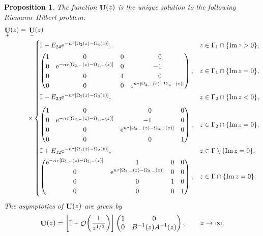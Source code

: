 \documentclass[10pt,a4paper]{amsart}
\DeclareMathOperator{\OO}{\mathcal{O}}
\DeclareMathOperator{\UU}{{\bf U}}
\numberwithin{equation}{section}
\newtheorem{Proposition}[Theorem]{Proposition}
 { \theoremstyle{definition}
\newtheorem{Definition}[Theorem]{Definition}
\newtheorem{Note}[Theorem]{Note}
\newtheorem{Example}[Theorem]{Example}
\newtheorem{Remark}[Theorem]{Remark} }
\begin{document}
 \begin{Proposition}
 The function $\UU(z)$ is the unique solution to the following Riemann--Hilbert problem:
 \begin{align*}%
 \UU_{+}(z)={}& \UU_{-}(z) \nonumber\\
 &{\times} \begin{cases}
 \mathbb{I} - E_{24}{\rm e}^{-n\tau[\Omega_2(z) - \Omega_4(z)]},
 & z \in \Gamma_1 \cap \{\operatorname{Im} z > 0\}, \vspace{1mm}\\
 \begin{pmatrix}
 1 & 0 & 0 & \hphantom{-}0 \\
 0 & {\rm e}^{-n\tau[\Omega_{2,-}(z)-\Omega_{4,-}(z)]} & 0 & -1\\
 0 & 0 & 1 & \hphantom{-}0 \\
 0 & 0 & 0 & {\rm e}^{n\tau[\Omega_{2,-}(z)-\Omega_{4,-}(z)]}
 \end{pmatrix},
 & z \in \Gamma_1 \cap \{\operatorname{Im} z = 0\},\vspace{1mm}\\
 \mathbb{I} - E_{23}{\rm e}^{-n\tau[\Omega_2(z) - \Omega_3(z)]},
 & z \in \Gamma_2 \cap \{\operatorname{Im} z < 0\}, \vspace{2mm}\\
 \begin{pmatrix}
 1 & 0 & \hphantom{-}0 & 0 \\
 0 & {\rm e}^{-n\tau[\Omega_{2,-}(z) - \Omega_{3,-}(z)]} & -1 & 0\\
 0 & 0 & {\rm e}^{n\tau[\Omega_{2,-}(z) - \Omega_{3,-}(z)]} & 0 \\
 0 & 0 & \hphantom{-}0 & 1
 \end{pmatrix},
 & z \in \Gamma_2 \cap \{\operatorname{Im} z = 0\}, \vspace{1mm}\\
 \mathbb{I} + E_{12}{\rm e}^{-n\tau[\Omega_1(z) - \Omega_2(z)]},
 & z\in \Gamma \setminus \{\operatorname{Im} z = 0\}, \vspace{1mm}\\
 \begin{pmatrix}
 {\rm e}^{-n\tau[\Omega_{1,-}(z)-\Omega_{2,-}(z)]} & 1 & 0 & 0\\
 0 & {\rm e}^{n\tau[\Omega_{1,-}(z)-\Omega_{2,-}(z)]} & 0 & 0\\
 0 & 0 & 1 & 0 \\
 0 & 0 & 0 & 1
 \end{pmatrix},
 & z\in \Gamma \cap \{\operatorname{Im} z = 0\}.
 \end{cases}
 \end{align*}
 The asymptotics of $\UU(z)$ are given by
 \begin{equation*} %
 \UU(z) =
 \biggl[\mathbb{I} + \OO\biggl(\frac{1}{z^{1/3}}\biggr)\biggr]\begin{pmatrix}
 1 & 0\\
 0 & B^{-1}(z) A^{-1}(z)
 \end{pmatrix}, \qquad z\to \infty.
 \end{equation*}
\end{Proposition}
\end{document}
